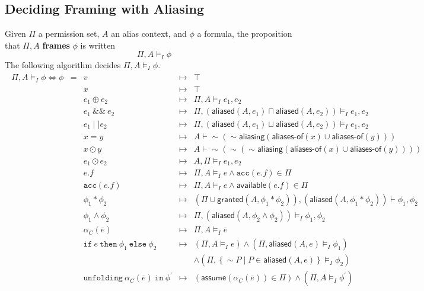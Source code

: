 \documentclass{article}
\newcommand{\tsf}{\textsf}
\newcommand{\tbf}{\textbf}
\newcommand{\ttt}{\texttt}
\newcommand{\assume}{\tsf{assume}}
\newcommand{\frames}{\vDash_I}
\newcommand{\mt}{\mapsto}
\newcommand{\set}[1]{\left\{ #1 \right\}}
\renewcommand{\vec}{\overline}
\newcommand{\p}{^\prime}
\newcommand{\entails}{\vdash}
\newcommand{\pnot}{\sim}
\newcommand{\cif}{\ttt{if}}
\newcommand{\cthen}{\ttt{then}}
\newcommand{\celse}{\ttt{else}}
\newcommand{\cacc}{\ttt{acc}}
\newcommand{\cunfolding}{\ttt{unfolding}}
\newcommand{\cin}{\ttt{in}}
\newcommand{\aliasing}{\tsf{aliasing}}
\newcommand{\merge}{\sqcap}
\newcommand{\overlap}{\sqcup}
\newcommand{\available}{\tsf{available}}
\newcommand{\granted}{\tsf{granted}}
\newcommand{\aliased}{\tsf{aliased}}
\begin{document}
\subsection{Deciding Framing with Aliasing}

Given $\Pi$ a permission set, $A$ an alias context, and $\phi$ a formula, the proposition that $\Pi, A$ \tbf{frames} $\phi$ is written
$$
\Pi, A \frames \phi
$$
The following algorithm decides $\Pi, A \frames \phi$.
\begin{align*}
\begin{array}{rclrl}
\Pi, A \frames \phi \iff \phi &=
%
%
&     v
&\mt& \top
\\
&&    x
&\mt& \top
\\
&&    e_1 \oplus e_2
&\mt& \Pi, A \frames e_1, e_2
\\
&&    e_1 \ \&\& \ e_2
&\mt& \Pi, (\aliased(A,e_1) \merge \aliased(A,e_2)) \frames e_1, e_2
\\
&&    e_1 \mid\mid e_2
&\mt& \Pi, (\aliased(A,e_1) \overlap \aliased(A,e_2)) \frames e_1, e_2
\\
&&    x = y
&\mt& A \entails \pnot(\pnot \aliasing( \tsf{aliases-of}(x) \cup \tsf{aliases-of}(y) ))
\\
&&    x \odot y
&\mt& A \entails \pnot(\pnot(\pnot \aliasing( \tsf{aliases-of}(x) \cup \tsf{aliases-of}(y) )))
\\
&&    e_1 \odot e_2
&\mt& A, \Pi \frames e_1, e_2
\\
&&    e.f
&\mt& \Pi, A \frames e \land \cacc(e.f) \in \Pi
\\
%
&&    \cacc(e.f)
&\mt& \Pi, A \frames e \land \available(e.f) \in \Pi
\\
&&    \phi_1 * \phi_2
&\mt& (\Pi \cup \granted(A, \phi_1 * \phi_2)), (\aliased(A, \phi_1 * \phi_2)) \entails \phi_1, \phi_2
\\
&&   \phi_1 \land \phi_2
&\mt& \Pi, (\aliased(A, \phi_2 \land \phi_2)) \frames \phi_1, \phi_2
\\
&&    \alpha_C(\vec{e})
&\mt& \Pi, A \frames \vec{e}
\\
&&    \cif \ e \ \cthen \ \phi_1 \ \celse \ \phi_2
&\mt& (\Pi, A \frames e)
\land (\Pi, \aliased(A, e) \frames \phi_1) \\ &&&&
\land (\Pi, \set{ \pnot P \mid P \in \aliased(A, e) } \frames \phi_2)
\\
&&    \cunfolding \ \alpha_C(\vec{e}) \ \cin \ \phi\p
&\mt& (\assume(\alpha_C(\vec{e})) \in \Pi)
\land (\Pi, A \frames \phi\p)
\end{array}
\end{align*}
\end{document}
